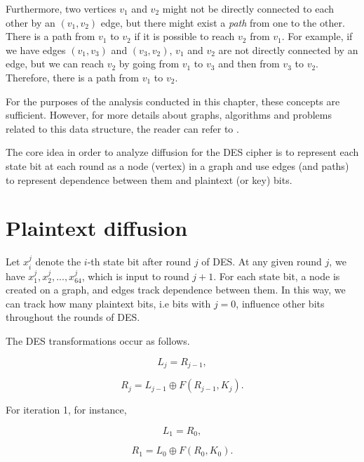 \documentclass{report}
\begin{document}
Furthermore, two vertices $v_1$ and $v_2$ might not be directly connected to each other by an $(v_1, v_2)$ edge, but there might exist a \emph{path} from one to the other. There is a path from $v_1$ to $v_2$ if it is possible to reach $v_2$ from $v_1$. For example, if we have edges $(v_1, v_3)$ and $(v_3, v_2)$, $v_1$ and $v_2$ are not directly connected by an edge, but we can reach $v_2$ by going from $v_1$ to $v_3$ and then from $v_3$ to $v_2$. Therefore, there is a path from $v_1$ to $v_2$.

For the purposes of the analysis conducted in this chapter, these concepts are sufficient. However, for more details about graphs, algorithms and problems related to this data structure, the reader can refer to \cite{Cormen2009}.

The core idea in order to analyze diffusion for the DES cipher is to represent each state bit at each round as a node (vertex) in a graph and use edges (and paths) to represent dependence between them and plaintext (or key) bits.

\section{Plaintext diffusion}

Let $x_i^j$ denote the $i$-th state bit after round $j$ of DES. At any given round $j$, we have $x_1^j, x_2^j, ..., x_{64}^j$, which is input to round $j + 1$. For each state bit, a node is created on a graph, and edges track dependence between them. In this way, we can track how many plaintext bits, i.e bits with $j = 0$, influence other bits throughout the rounds of DES.

The DES transformations occur as follows.

\begin{equation*}
    L_j = R_{j-1},
\end{equation*}

\begin{equation*}
    R_j = L_{j-1} \oplus F(R_{j-1}, K_j).
\end{equation*}

For iteration 1, for instance,

\begin{equation*}
    L_1 = R_0,
\end{equation*}

\begin{equation*}
    R_1 = L_{0} \oplus F(R_{0}, K_0).
\end{equation*}
\end{document}

